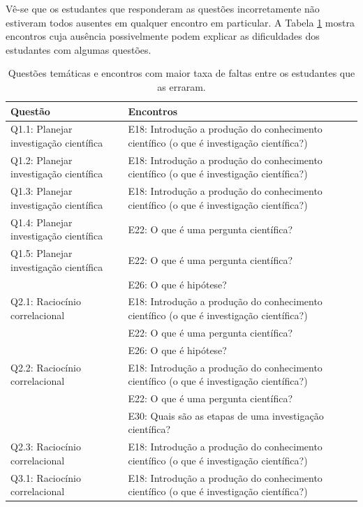 \documentclass[
]{book}
\begin{document}
Vê-se que os estudantes que responderam as questões incorretamente não estiveram todos ausentes em qualquer encontro em particular. A Tabela \ref{tab:quadroimpacto4} mostra encontros cuja ausência possivelmente podem explicar as dificuldades dos estudantes com algumas questões.

\begin{table}

\caption{\label{tab:quadroimpacto4}Questões temáticas e encontros com maior taxa de faltas entre os estudantes que as erraram.}
\centering
\begin{tabular}[t]{l|l}
\hline
Questão & Encontros\\
\hline
Q1.1: Planejar investigação científica & E18: Introdução a produção do conhecimento científico (o que é investigação científica?)\\
\hline
Q1.2: Planejar investigação científica & E18: Introdução a produção do conhecimento científico (o que é investigação científica?)\\
\hline
Q1.3: Planejar investigação científica & E18: Introdução a produção do conhecimento científico (o que é investigação científica?)\\
\hline
Q1.4: Planejar investigação científica & E22: O que é uma pergunta científica?\\
\hline
Q1.5: Planejar investigação científica & E22: O que é uma pergunta científica?\\
\hline
 & E26: O que é hipótese?\\
\hline
Q2.1: Raciocínio correlacional & E18: Introdução a produção do conhecimento científico (o que é investigação científica?)\\
\hline
 & E22: O que é uma pergunta científica?\\
\hline
 & E26: O que é hipótese?\\
\hline
Q2.2: Raciocínio correlacional & E18: Introdução a produção do conhecimento científico (o que é investigação científica?)\\
\hline
 & E22: O que é uma pergunta científica?\\
\hline
 & E30: Quais são as etapas de uma investigação científica?\\
\hline
Q2.3: Raciocínio correlacional & E18: Introdução a produção do conhecimento científico (o que é investigação científica?)\\
\hline
Q3.1: Raciocínio correlacional & E18: Introdução a produção do conhecimento científico (o que é investigação científica?)\\

\end{tabular}
\end{table}
\end{document}
